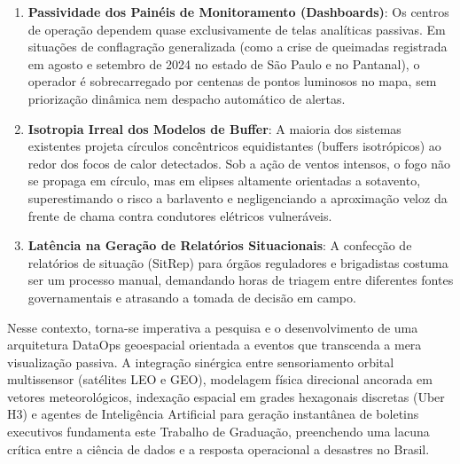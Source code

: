 \begin{enumerate}
    \item \textbf{Passividade dos Painéis de Monitoramento (Dashboards)}: Os centros de operação dependem quase exclusivamente de telas analíticas passivas. Em situações de conflagração generalizada (como a crise de queimadas registrada em agosto e setembro de 2024 no estado de São Paulo e no Pantanal), o operador é sobrecarregado por centenas de pontos luminosos no mapa, sem priorização dinâmica nem despacho automático de alertas.
    \item \textbf{Isotropia Irreal dos Modelos de Buffer}: A maioria dos sistemas existentes projeta círculos concêntricos equidistantes (buffers isotrópicos) ao redor dos focos de calor detectados. Sob a ação de ventos intensos, o fogo não se propaga em círculo, mas em elipses altamente orientadas a sotavento, superestimando o risco a barlavento e negligenciando a aproximação veloz da frente de chama contra condutores elétricos vulneráveis.
    \item \textbf{Latência na Geração de Relatórios Situacionais}: A confecção de relatórios de situação (SitRep) para órgãos reguladores e brigadistas costuma ser um processo manual, demandando horas de triagem entre diferentes fontes governamentais e atrasando a tomada de decisão em campo.
\end{enumerate}

Nesse contexto, torna-se imperativa a pesquisa e o desenvolvimento de uma arquitetura DataOps geoespacial orientada a eventos que transcenda a mera visualização passiva. A integração sinérgica entre sensoriamento orbital multissensor (satélites LEO e GEO), modelagem física direcional ancorada em vetores meteorológicos, indexação espacial em grades hexagonais discretas (Uber H3) e agentes de Inteligência Artificial para geração instantânea de boletins executivos fundamenta este Trabalho de Graduação, preenchendo uma lacuna crítica entre a ciência de dados e a resposta operacional a desastres no Brasil.
